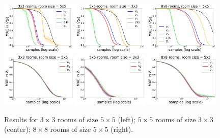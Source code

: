 \begin{figure}[!htb]
\centering
\includegraphics[width=0.32\textwidth]{figures/chapter1/learning/nrooms_3_3.png}
\includegraphics[width=0.32\textwidth]{figures/chapter1/learning/nrooms_5_5.png}
\includegraphics[width=0.32\textwidth]{figures/chapter1/learning/nrooms_8_8.png}
\includegraphics[width=0.32\textwidth]{figures/chapter1/subtasks/nrooms_3_3_subtasks.png}
\includegraphics[width=0.32\textwidth]{figures/chapter1/subtasks/nrooms_5_5_subtasks.png}
\includegraphics[width=0.32\textwidth]{figures/chapter1/subtasks/nrooms_8_8_subtasks.png}
\caption{ Results for $3\times 3$ rooms of size $5 \times 5$ (left);
$5\times 5$ rooms of size $3 \times 3$ (center); $8 \times 8$ rooms of size $5\times 5$ (right).}
\label{fig:hlmdps_errors_nrooms}
\end{figure}

